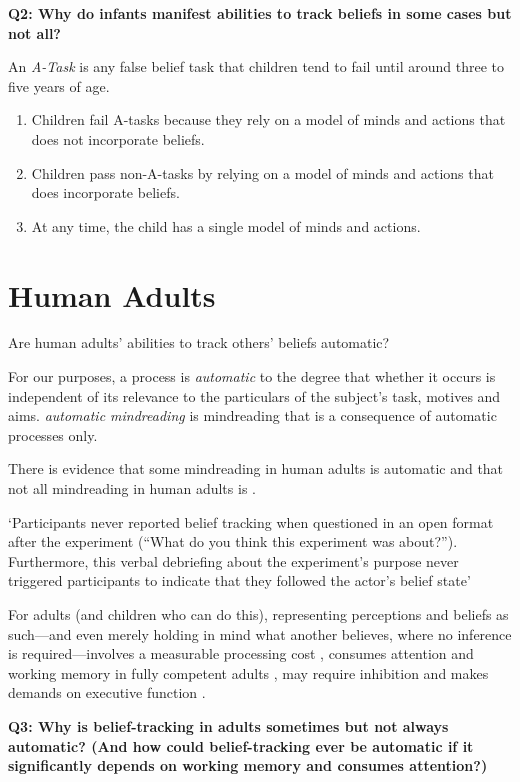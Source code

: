 \documentclass[12pt]{extarticle}
\begin{document}
\begin{multicols*}{3}
\textbf{Q2: Why do infants manifest abilities to track beliefs in some cases but not all?}

An \emph{A-Task} is any false belief task that children tend to fail until around
three to five years of age.

\begin{enumerate}
\item Children fail A-tasks
because they rely on a model of minds and actions that does not incorporate beliefs.
\item Children pass non-A-tasks
by relying on a model of minds and actions that does incorporate beliefs.
\item At any time, the child has a single model of minds and actions.
\end{enumerate}



\section{Human Adults}

Are human adults’ abilities to track others’ beliefs automatic?

For our purposes, a process is \emph{automatic} to the degree that whether it occurs is independent of
its relevance to the particulars of the subject's task, motives and aims.  \emph{automatic mindreading} is mindreading that is a consequence of
automatic processes only.


There is evidence that some mindreading in human adults is
 automatic
\citep[e.g.][]{kovacs_social_2010,Schneider:2011fk,Wel:2013uq} and
that not all mindreading in human adults is
\citep{apperly:2008_back,apperly:2010_limits,Wel:2013uq}.

‘Participants never reported belief tracking when questioned in an open format after the experiment
(“What do you think this experiment was about?”). Furthermore, this verbal debriefing about the
experiment’s purpose never triggered participants to indicate that they followed the actor’s belief
state’ \citep[p.~2]{Schneider:2011fk}


For adults (and children who can do this),
representing perceptions and beliefs as such---and even merely holding in mind
what another believes, where no inference is required---involves a measurable
processing cost \citep{apperly:2008_back,apperly:2010_limits}, consumes attention
and working memory in fully competent adults \citealp{Apperly:2009cc,
lin:2010_reflexively, McKinnon:2007rr},  may require inhibition \citep{bull:2008_role}
and makes demands on executive function \citep{apperly:2004_frontal,samson:2005_seeing}.

\textbf{Q3: Why is belief-tracking in adults sometimes but not always automatic?
(And how could belief-tracking ever be automatic if it significantly depends on working memory and consumes attention?)}



\footnotesize


\end{multicols*}
\end{document}

